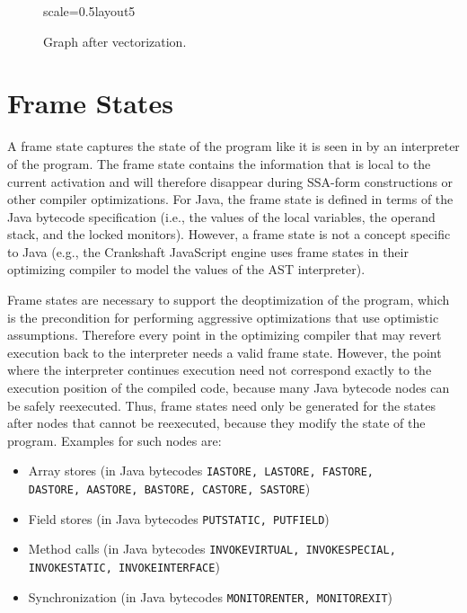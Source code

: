\documentclass[twocolumn]{svjour3}
\begin{document}
\begin{figure}[ht]
  \centering
\begin{digraphenv}{scale=0.5}{layout5}
\end{digraphenv}
  \caption{Graph after vectorization.}
  \label{fig:loop5}
\end{figure}


\section{Frame States}
A frame state captures the state of the program like it is seen in by an interpreter of the program.
The frame state contains the information that is local to the current activation and will therefore disappear during SSA-form constructions or other compiler optimizations.
For Java, the frame state is defined in terms of the Java bytecode specification (i.e., the values of the local variables, the operand stack, and the locked monitors).
However, a frame state is not a concept specific to Java (e.g., the Crankshaft JavaScript engine uses frame states in their optimizing compiler to model the values of the AST interpreter).

Frame states are necessary to support the deoptimization of the program, which is the precondition for performing aggressive optimizations that use optimistic assumptions.
Therefore every point in the optimizing compiler that may revert execution back to the interpreter needs a valid frame state.
However, the point where the interpreter continues execution need not correspond exactly to the execution position of the compiled code, because many Java bytecode nodes can be safely reexecuted.
Thus, frame states need only be generated for the states after nodes that cannot be reexecuted, because they modify the state of the program.
Examples for such nodes are:

\begin{itemize}
    \item Array stores (in Java bytecodes {\tt IASTORE, LASTORE, FASTORE, \\DASTORE, AASTORE, BASTORE, CASTORE, SASTORE})
    \item Field stores (in Java bytecodes {\tt PUTSTATIC, PUTFIELD})
    \item Method calls (in Java bytecodes {\tt INVOKEVIRTUAL, INVOKESPECIAL, \\INVOKESTATIC, INVOKEINTERFACE})
    \item Synchronization (in Java bytecodes {\tt MONITORENTER, MONITOREXIT})
\end{itemize}
\end{document}
